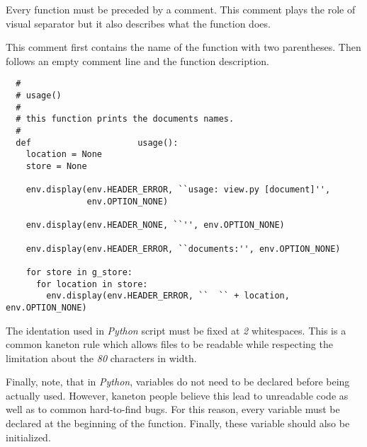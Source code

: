 Every function must be preceded by a comment. This comment plays the role
of visual separator but it also describes what the function does.

This comment first contains the name of the function with two parentheses.
Then follows an empty comment line and the function description.

\begin{verbatim}
  #
  # usage()
  #
  # this function prints the documents names.
  #
  def                     usage():
    location = None
    store = None

    env.display(env.HEADER_ERROR, ``usage: view.py [document]'',
                env.OPTION_NONE)

    env.display(env.HEADER_NONE, ``'', env.OPTION_NONE)

    env.display(env.HEADER_ERROR, ``documents:'', env.OPTION_NONE)

    for store in g_store:
      for location in store:
        env.display(env.HEADER_ERROR, ``  `` + location, env.OPTION_NONE)
\end{verbatim}

The identation used in \textit{Python} script must be fixed at \textit{2}
whitespaces. This is a common kaneton rule which allows files to be
readable while respecting the limitation about the \textit{80} characters
in width.

Finally, note, that in \textit{Python}, variables do not need to be declared
before being actually used. However, kaneton people believe this lead
to unreadable code as well as to common hard-to-find bugs. For this reason,
every variable must be declared at the beginning of the function. Finally,
these variable should also be initialized.
